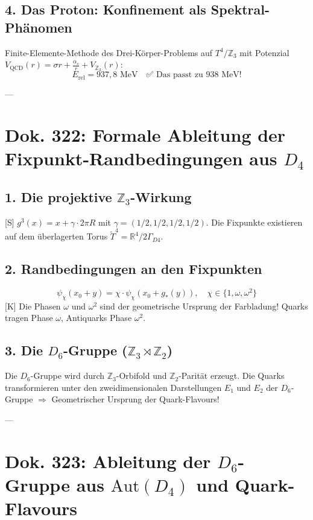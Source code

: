 \documentclass[11pt,a4paper]{article}
\begin{document}
	\subsection{4. Das Proton: Konfinement als Spektral-Phänomen}
	Finite-Elemente-Methode des Drei-Körper-Problems auf $T^4/\mathbb{Z}_3$ mit Potenzial $V_{\text{QCD}}(r) = \sigma r + \frac{\alpha_s}{r} + V_{\mathbb{Z}_3}(r)$:
	\begin{equation}
		E_{\text{rel}} = 937{,}8\text{ MeV} \quad \text{✅ Das passt zu } 938\text{ MeV!}
	\end{equation}
	
	---
	
	\section{Dok. 322: Formale Ableitung der Fixpunkt-Randbedingungen aus $D_4$}
	
	\subsection{1. Die projektive $\mathbb{Z}_3$-Wirkung}
	[S] $g^3(x) = x + \gamma \cdot 2\pi R$ mit $\gamma = (1/2, 1/2, 1/2, 1/2)$.
	Die Fixpunkte existieren auf dem überlagerten Torus $\tilde{T}^4 = \mathbb{R}^4/2\Gamma_{D4}$.
	
	\subsection{2. Randbedingungen an den Fixpunkten}
	\begin{equation}
		\psi_{\chi}(x_0 + y) = \chi \cdot \psi_{\chi}(x_0 + g_*(y)), \quad \chi \in \{1, \omega, \omega^2\}
	\end{equation}
	[K] Die Phasen $\omega$ und $\omega^2$ sind der geometrische Ursprung der Farbladung! Quarks tragen Phase $\omega$, Antiquarks Phase $\omega^2$.
	
	\subsection{3. Die $D_6$-Gruppe ($\mathbb{Z}_3 \rtimes \mathbb{Z}_2$)}
	Die $D_6$-Gruppe wird durch $\mathbb{Z}_3$-Orbifold und $\mathbb{Z}_2$-Parität erzeugt. Die Quarks transformieren unter den zweidimensionalen Darstellungen $E_1$ und $E_2$ der $D_6$-Gruppe $\Rightarrow$ Geometrischer Ursprung der Quark-Flavours!
	
	---
	
	\section{Dok. 323: Ableitung der $D_6$-Gruppe aus \texorpdfstring{$\text{Aut}(D_4)$}{Aut(D4)} und Quark-Flavours}
	
\end{document}
